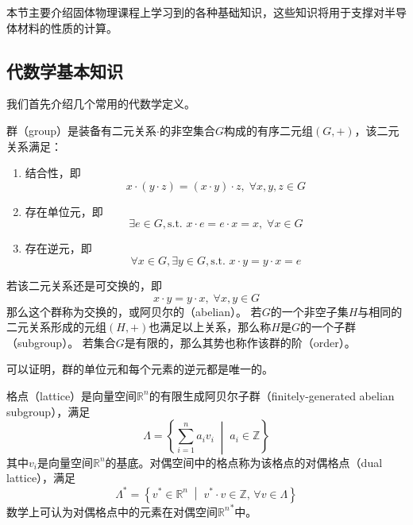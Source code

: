
本节主要介绍固体物理课程上学习到的各种基础知识，这些知识将用于支撑对半导体材料的性质的计算。

\subsection{代数学基本知识}

我们首先介绍几个常用的代数学定义。

\begin{definition}
    群（group）是装备有二元关系$\cdot$的非空集合$G$构成的有序二元组$(G, +)$，该二元关系满足：
    \begin{enumerate}[nosep]
        \item 结合性，即
            \begin{equation}x\cdot ( y \cdot z) = (x \cdot y) \cdot z, \; \forall x,y,z \in G\end{equation}
        \item 存在单位元，即
            \begin{equation}\exists e \in G, \text{s.t. } x \cdot e = e\cdot x = x, \; \forall x \in G\end{equation}
        \item 存在逆元，即
            \begin{equation}\forall x \in G, \exists y \in G, \text{s.t. } x \cdot y = y \cdot x = e\end{equation}
    \end{enumerate}
    若该二元关系还是可交换的，即
    \begin{equation}x \cdot y = y \cdot x, \; \forall x, y \in G\end{equation}
    那么这个群称为交换的，或阿贝尔的（abelian）。
    若$G$的一个非空子集$H$与相同的二元关系形成的元组$(H,+)$也满足以上关系，那么称$H$是$G$的一个子群（subgroup）。
    若集合$G$是有限的，那么其势也称作该群的阶（order）。
\end{definition}

可以证明，群的单位元和每个元素的逆元都是唯一的。

\begin{definition}
    格点（lattice）是向量空间$\mathbb R^n$的有限生成阿贝尔子群（finitely-generated abelian subgroup），满足
    \begin{equation}\Lambda = \left\{ \sum_{i=1}^n a_i v_i \; \middle\vert\; a_i \in \mathbb Z \right\}\end{equation}
    其中$v_i$是向量空间$\mathbb R^n$的基底。对偶空间中的格点称为该格点的对偶格点（dual lattice），满足
    \begin{equation}\Lambda^* = \left\{ v^* \in \mathbb R^n \; \middle\vert \; v^* \cdot v \in \mathbb Z ,\, \forall v \in \Lambda \right\}\end{equation}
    数学上可认为对偶格点中的元素在对偶空间${{\mathbb{R}}^n}^*$中。
\end{definition}

